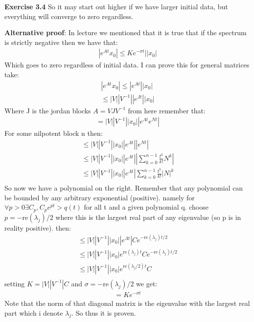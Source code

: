 \documentclass[12pt]{article}
\newenvironment{exercise}[1]{\vspace{.1in}\noindent\textbf{Exercise #1 \hspace{.05em}}}{}
\theoremstyle{definition}
\theoremstyle{remark}
\begin{document}
\begin{exercise}{3.4}
	So it may start out higher if we have larger initial data, but everything will converge to zero regardless.

	\textbf{Alternative proof}: In lecture we mentioned that it is true that if the spectrum is strictly negative then we have that:
	\begin{align}
		|e^{At}x_0|\leq Ke^{-\sigma t}||x_0|
	\end{align}
	Which goes to zero regardless of initial data. I can prove this for general matrices take:
	\begin{align}
		|e^{At}x_0|\leq |e^{At}||x_0| \\
		\leq |V||V^{-1}||e^{Jt}||x_0|
	\end{align}
	Where J is the jordan blocks $A=VJV^{-1}$ from here remember that:
	\begin{align}
		=|V||V^{-1}||x_0||e^{\Lambda t}e^{Nt}|
	\end{align}
	For some nilpotent block n then:
	\begin{align}
		\leq |V||V^{-1}||x_0||e^{\Lambda t}||e^{Nt}|                             \\
		\leq |V||V^{-1}||x_0||e^{\Lambda t}||\sum_{k=0}^{n-1} \frac{t^k}{k!}N^k| \\
		\leq |V||V^{-1}||x_0||e^{\Lambda t}|\sum_{k=0}^{n-1} \frac{t^k}{k!}|N|^k \\
	\end{align}
	So now we have a polynomial on the right. Remember that any polynomial can be bounded by any arbitrary exponential (positive). namely for $\forall p>0\exists C_p, C_pe^{pt}>q(t)$ for all t and a given polynomial q. choose $p=-\text{re}(\lambda_j)/2$ where this is the largest real part of any eigenvalue (so p is in reality positive). then:
	\begin{align}
		\leq|V||V^{-1}||x_0||e^{\Lambda t}| Ce^{-\text{re}(\lambda_j)t/2}           \\
		\leq|V||V^{-1}||x_0|e^{\text{re}(\lambda_j) t}Ce^{-\text{re}(\lambda_j)t/2} \\
		\leq|V||V^{-1}||x_0|e^{\text{re}(\lambda_j/2) t} C                          \\
	\end{align}
	setting $K=|V||V^{-1}|C$ and $\sigma = -\text{re}(\lambda_j)/2$ we get:
	\begin{align}
		=Ke^{-\sigma t}
	\end{align}
	Note that the norm of that diagonal matrix is the eigenvalue with the largest real part which i denote $\lambda_j$. So thus it is proven.
\end{exercise}
\end{document}
